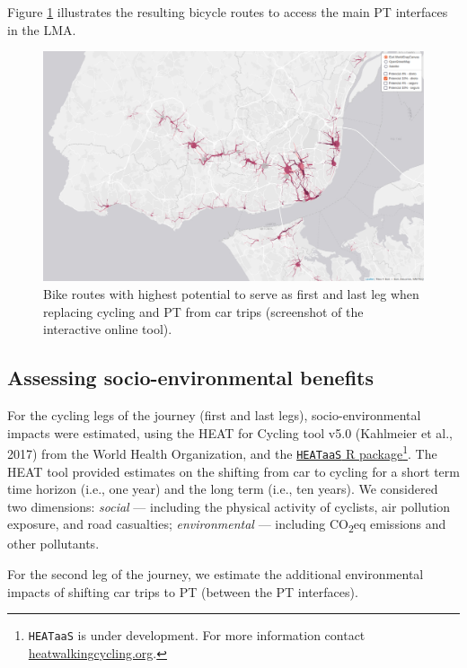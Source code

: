 \documentclass[review, doubleblind, 3p,
authoryear]{elsarticle} %
\begin{document}
Figure \ref{fig:map2} illustrates the resulting bicycle routes to access
the main PT interfaces in the LMA.

\begin{figure}

{\centering \includegraphics[width=0.8\linewidth,]{img/map2} 

}

\caption{Bike routes with highest potential to serve as first and last leg when replacing cycling and PT from car trips (screenshot of the interactive online tool).}\label{fig:map2}
\end{figure}

\hypertarget{assessing-socio-environmental-benefits}{%
\subsection{Assessing socio-environmental
benefits}\label{assessing-socio-environmental-benefits}}

For the cycling legs of the journey (first and last legs),
socio-environmental impacts were estimated, using the HEAT for Cycling
tool v5.0 (Kahlmeier et al., 2017) from the World Health Organization,
and the
\href{https://github.com/HEAT-WHO/HEAT_heatr_api}{\texttt{HEATaaS} R
package}\footnote{\texttt{HEATaaS} is under development. For more
  information contact
  \href{https://heatwalkingcycling.org}{heatwalkingcycling.org}.}. The
HEAT tool provided estimates on the shifting from car to cycling for a
short term time horizon (i.e., one year) and the long term (i.e., ten
years). We considered two dimensions: \emph{social} --- including the
physical activity of cyclists, air pollution exposure, and road
casualties; \emph{environmental} --- including CO\textsubscript{2}eq
emissions and other pollutants.

For the second leg of the journey, we estimate the additional
environmental impacts of shifting car trips to PT (between the PT
interfaces).
\end{document}
